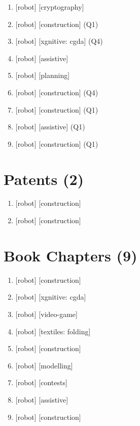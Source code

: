 \documentclass{article}
\begin{document}
\begin{enumerate}
  \item {} [robot] [cryptography]
  \item {} [robot] [construction] (Q1)
  \item {} [robot] [xgnitive: cgda] (Q4)
  \item {} [robot] [assistive]
  \item {} [robot] [planning]
  \item {} [robot] [construction] (Q4)
  \item {} [robot] [construction] (Q1)
  \item {} [robot] [assistive] (Q1)
  \item {} [robot] [construction] (Q1)
\end{enumerate}

\section*{Patents (2)}
\begin{enumerate}
  \item {} [robot] [construction]
  \item {} [robot] [construction]
\end{enumerate}

\section*{Book Chapters (9)}
\begin{enumerate}
  \item {} [robot] [construction]
  \item {} [robot] [xgnitive: cgda]
  \item {} [robot] [video-game]
  \item {} [robot] [textiles: folding]
  \item {} [robot] [construction]
  \item {} [robot] [modelling]
  \item {} [robot] [contests]
  \item {} [robot] [assistive]
  \item {} [robot] [construction]
\end{enumerate}
\end{document}
